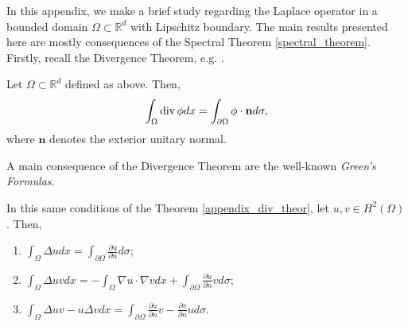 

In this appendix, we make a brief study regarding the Laplace operator in a bounded domain \(\Omega \subset \mathbb{R}^d\) with Lipschitz boundary. The main results presented here are mostly consequences of the Spectral Theorem \ref{spectral_theorem}. Firstly, recall the Divergence Theorem, e.g. \cite{evans2015measure}.
\begin{theorem}\label{appendix_div_theor}
    Let \(\Omega \subset \mathbb{R}^d\) defined as above. Then,
    \[
      \int_\Omega \operatorname{div} \phi dx = \int_{\partial\Omega} \phi \cdot \mathbf{n} d\sigma,
    \]
    where \(\mathbf{n}\) denotes the exterior unitary normal.
\end{theorem}
A main consequence of the Divergence Theorem are the well-known \textit{Green's Formulas}.
\begin{corollary}
    In this same conditions of the Theorem \ref{appendix_div_theor}, let \(u, v \in H^2(\Omega)\). Then,
    \begin{enumerate}
        \item \(\int_\Omega \Delta u dx = \int_{\partial \Omega} \frac{\partial u}{\partial n} d\sigma\);
        \item \(\int_\Omega \Delta u v dx = -\int_\Omega \nabla u \cdot \nabla v dx + \int_{\partial \Omega} \frac{\partial u}{\partial n}v d\sigma\);
        \item \(\int_\Omega \Delta u v - u \Delta v dx= \int_{\partial \Omega} \frac{\partial u}{\partial n}v - \frac{\partial v}{\partial n}u d\sigma\).
    \end{enumerate}
\end{corollary}

